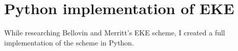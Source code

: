 \chapter{Python implementation of EKE}

While researching Bellovin and Merritt's EKE scheme\cite{eke}, I created a full implementation of the scheme in Python.

\inputminted[firstline=36,lastline=76,gobble=4]{python}{eke_python/client.py}

